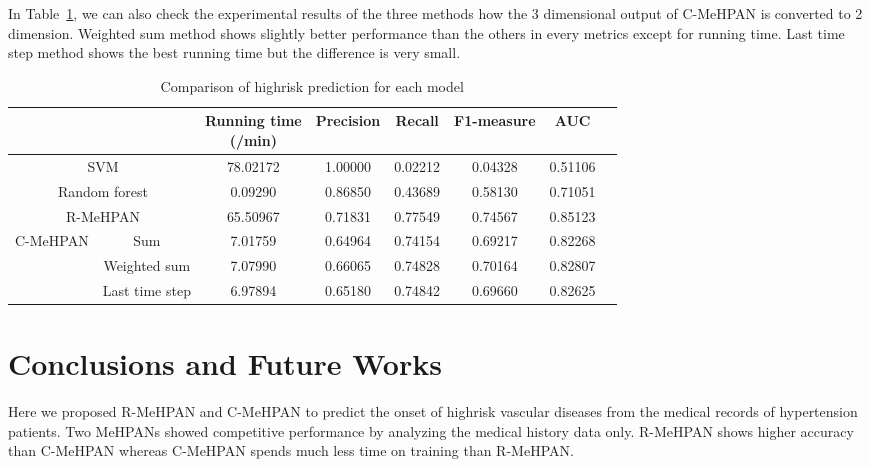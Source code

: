 \documentclass{article}
\begin{document}
In Table~\ref{table::performance}, we can also check the experimental results of the three methods how the 3 dimensional output of C-MeHPAN is converted to 2 dimension. Weighted sum method shows slightly better performance than the others in every metrics except for running time. Last time step method shows the best running time but the difference is very small.  




\begin{table}
  \caption{Comparison of highrisk prediction for each model}
  \label{table::performance}
  \centering
  \begin{tabularx}{\textwidth}{X|c|cccccc}
  \toprule
  \multicolumn{2}{c|}{} & \makecell{Running time \\ (/min)} & Precision & Recall & F1-measure & AUC \\ \midrule
  \multicolumn{2}{c|}{SVM} & 78.02172 & 1.00000 & 0.02212 & 0.04328 & 0.51106 \\ \midrule
  \multicolumn{2}{c|}{Random forest} & 0.09290 & 0.86850 & 0.43689 & 0.58130 & 0.71051 \\ \midrule
  \multicolumn{2}{c|}{R-MeHPAN} & 65.50967 & 0.71831 & 0.77549 & 0.74567 & 0.85123 \\ \midrule
  \multirow{3}{*}{C-MeHPAN} & Sum & 7.01759 & 0.64964 & 0.74154 & 0.69217 & 0.82268 \\ \cline{2-7}
                                          & Weighted sum & 7.07990 & 0.66065 & 0.74828 & 0.70164 & 0.82807 \\ \cline{2-7}
                                          & Last time step & 6.97894 & 0.65180 & 0.74842 & 0.69660 & 0.82625 \\ 
  \bottomrule
  \end{tabularx}
\end{table}








\section{Conclusions and Future Works}
\label{Conclusions}
Here we proposed R-MeHPAN and C-MeHPAN to predict the onset of highrisk vascular diseases from the medical records of hypertension patients. Two MeHPANs showed competitive performance by analyzing the medical history data only. R-MeHPAN shows higher accuracy than C-MeHPAN whereas C-MeHPAN spends much less time on training than R-MeHPAN.
\end{document}
